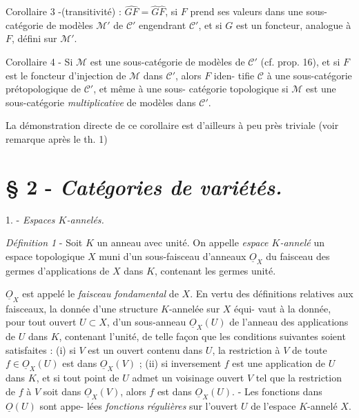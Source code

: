 Corollaire 3 -(transitivité) : $\widehat{GF} = \hat{G} \hat{F}$, si $F$ prend ses valeurs dans
une sous-catégorie de modèles $\mathcal{M}'$ de $\mathcal{C}'$ engendrant $\mathcal{C}'$, et si $G$ est un
foncteur, analogue à $F$, défini sur $\mathcal{M}'$.

Corollaire 4 - Si $\mathcal{M}$ est une sous-catégorie de modèles de $\mathcal{C}'$ (cf. prop.
16), et si $F$ est le foncteur d'injection de $\mathcal{M}$ dans $\mathcal{C}'$, alors $F$ iden-
tifie $\mathcal{C}$ à une sous-catégorie prétopologique de $\mathcal{C}'$, et même à une sous-
catégorie topologique si $\mathcal{M}$ est une sous-catégorie \emph{multiplicative} de
modèles dans $\mathcal{C}'$.

La démonstration directe de ce corollaire est d'ailleurs à peu
près triviale (voir remarque après le th. 1)

\newpage



\section*{§ 2 - \emph{Catégories de variétés.}}

1. - \emph{Espaces $K$-annelés.}

\emph{Définition 1} - Soit $K$ un anneau avec unité. On appelle \emph{espace $K$-annelé}
un espace topologique $X$ muni d'un sous-faisceau d'anneaux $\underline{O}_X$ du faisceau
des germes d'applications de $X$ dans $K$, contenant les germes unité.

$\underline{O}_X$ est appelé le \emph{faisceau fondamental} de $X$. En vertu des définitions
relatives aux faisceaux, la donnée d'une structure $K$-annelée sur $X$ équi-
vaut à la donnée, pour tout ouvert $U \subset X$, d'un sous-anneau $\underline{O}_X(U)$ de
l'anneau des applications de $U$ dans $K$, contenant l'unité, de telle façon
que les conditions suivantes soient satisfaites : (i) si $V$ est un ouvert
contenu dans $U$, la restriction à $V$ de toute $f \in \underline{O}_X(U)$ est dans $\underline{O}_X(V)$ ;
(ii) si inversement $f$ est une application de $U$ dans $K$, et si tout point
de $U$ admet un voisinage ouvert $V$ tel que la restriction de $f$ à $V$ soit
dans $\underline{O}_X(V)$, alors $f$ est dans $\underline{O}_X(U)$. - Les fonctions dans $\underline{O}(U)$ sont appe-
lées \emph{fonctions régulières} sur l'ouvert $U$ de l'espace $K$-annelé $X$.

